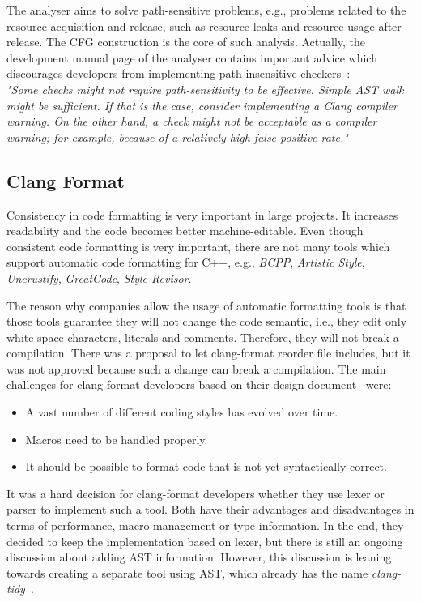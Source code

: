 The analyser aims to solve path-sensitive problems, e.g., problems related to the resource acquisition and release, such as resource leaks and resource usage after release. The CFG construction is the core of such analysis. Actually, the development manual page of the analyser contains important advice which discourages developers from implementing path-insensitive checkers~\cite{clang-analyzer-manual}:\\

\label{clang-analyzer-checkers}
\emph{"Some checks might not require path-sensitivity to be effective. Simple AST walk might be sufficient. If that is the case, consider implementing a Clang compiler warning. On the other hand, a check might not be acceptable as a compiler warning; for example, because of a relatively high false positive rate."}

\subsection{Clang Format}
\label{clang-format}
Consistency in code formatting is very important in large projects. It increases readability and the code becomes better machine-editable. Even though consistent code formatting is very important, there are not many tools which support automatic code formatting for C++, e.g., \emph{BCPP}, \emph{Artistic Style}, \emph{Uncrustify}, \emph{GreatCode}, \emph{Style Revisor}.

The reason why companies allow the usage of automatic formatting tools is that those tools guarantee they will not change the code semantic, i.e., they edit only white space characters, literals and comments. Therefore, they will not break a compilation. There was a proposal to let clang-format reorder file includes, but it was not approved because such a change can break a compilation. The main challenges for clang-format developers based on their design document~\cite{clang-format-design} were:

\begin{itemize}
\item A vast number of different coding styles has evolved over time.
\item Macros need to be handled properly.
\item It should be possible to format code that is not yet syntactically correct.
\end{itemize}

It was a hard decision for clang-format developers whether they use lexer or parser to implement such a tool. Both have their advantages and disadvantages in terms of performance, macro management or type information. In the end, they decided to keep the implementation based on lexer, but there is still an ongoing discussion about adding AST information. However, this discussion is leaning towards creating a separate tool using AST, which already has the name \emph{clang-tidy}~\cite{clang-tidy}.

